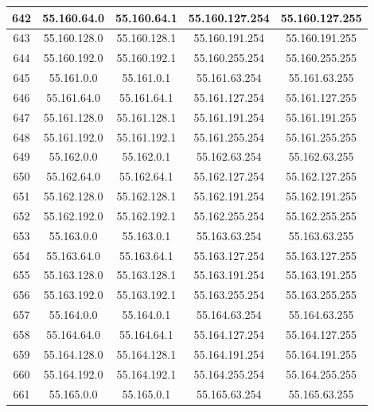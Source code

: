 \documentclass[letterpaper,12pt]{article}
\begin{document}
\begin{center}
\begin{longtable}{|c|c|c|c|c|}
                642 & 55.160.64.0 & 55.160.64.1 & 55.160.127.254 & 55.160.127.255 \\ \hline
                643 & 55.160.128.0 & 55.160.128.1 & 55.160.191.254 & 55.160.191.255 \\ \hline
                644 & 55.160.192.0 & 55.160.192.1 & 55.160.255.254 & 55.160.255.255 \\ \hline
                645 & 55.161.0.0 & 55.161.0.1 & 55.161.63.254 & 55.161.63.255 \\ \hline
                646 & 55.161.64.0 & 55.161.64.1 & 55.161.127.254 & 55.161.127.255 \\ \hline
                647 & 55.161.128.0 & 55.161.128.1 & 55.161.191.254 & 55.161.191.255 \\ \hline
                648 & 55.161.192.0 & 55.161.192.1 & 55.161.255.254 & 55.161.255.255 \\ \hline
                649 & 55.162.0.0 & 55.162.0.1 & 55.162.63.254 & 55.162.63.255 \\ \hline
                650 & 55.162.64.0 & 55.162.64.1 & 55.162.127.254 & 55.162.127.255 \\ \hline
                651 & 55.162.128.0 & 55.162.128.1 & 55.162.191.254 & 55.162.191.255 \\ \hline
                652 & 55.162.192.0 & 55.162.192.1 & 55.162.255.254 & 55.162.255.255 \\ \hline
                653 & 55.163.0.0 & 55.163.0.1 & 55.163.63.254 & 55.163.63.255 \\ \hline
                654 & 55.163.64.0 & 55.163.64.1 & 55.163.127.254 & 55.163.127.255 \\ \hline
                655 & 55.163.128.0 & 55.163.128.1 & 55.163.191.254 & 55.163.191.255 \\ \hline
                656 & 55.163.192.0 & 55.163.192.1 & 55.163.255.254 & 55.163.255.255 \\ \hline
                657 & 55.164.0.0 & 55.164.0.1 & 55.164.63.254 & 55.164.63.255 \\ \hline
                658 & 55.164.64.0 & 55.164.64.1 & 55.164.127.254 & 55.164.127.255 \\ \hline
                659 & 55.164.128.0 & 55.164.128.1 & 55.164.191.254 & 55.164.191.255 \\ \hline
                660 & 55.164.192.0 & 55.164.192.1 & 55.164.255.254 & 55.164.255.255 \\ \hline
                661 & 55.165.0.0 & 55.165.0.1 & 55.165.63.254 & 55.165.63.255 \\ \hline

\end{longtable}
\end{center}
\end{document}
